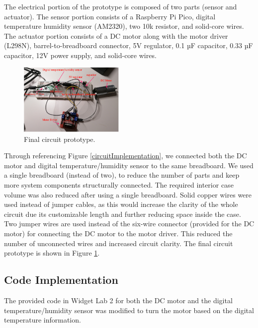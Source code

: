 \documentclass[11pt]{article}
\begin{document}
The electrical portion of the prototype is composed of two parts (sensor and actuator). The sensor portion consists of a Raspberry Pi Pico, digital temperature humidity sensor (AM2320), two 10k resistor, and solid-core wires. The actuator portion consists of a DC motor along with the motor driver (L298N), barrel-to-breadboard connector, 5V regulator, 0.1 µF capacitor, 0.33 µF capacitor, 12V power supply, and solid-core wires.

\begin{figure}
    \centering
    \includegraphics[width=0.45\textwidth]{finalCircuitPrototype}
  \caption{Final circuit prototype.}
  \label{finalCircuitPrototype}
\end{figure}

Through referencing Figure \ref{circuitImplementation}, we connected both the DC motor and digital temperature/humidity sensor to the same breadboard. We used a single breadboard (instead of two), to reduce the number of parts and keep more system components structurally connected. The required interior case volume was also reduced after using a single breadboard. Solid copper wires were used instead of jumper cables, as this would increase the clarity of the whole circuit due its customizable
length and further reducing space inside the case. Two jumper wires are used instead of the six-wire connector (provided for the DC motor) for connecting the DC motor to the motor driver. This reduced the number of unconnected wires and increased circuit clarity. The final circuit prototype is shown in Figure \ref{finalCircuitPrototype}.

\subsection{Code Implementation}
The provided code in Widget Lab 2 for both the DC motor and the digital temperature/humidity sensor was modified to turn the motor based on the digital temperature information.
\end{document}
